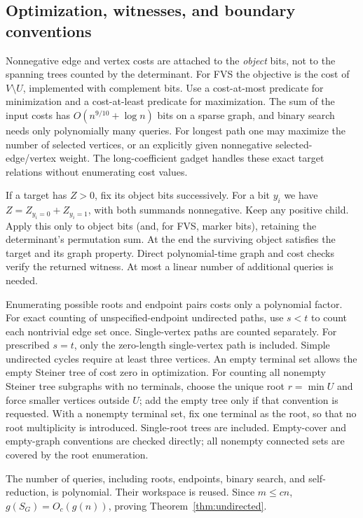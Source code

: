 \subsection{Optimization, witnesses, and boundary conventions}

Nonnegative edge and vertex costs are attached to the \emph{object}
bits, not to the spanning trees counted by the determinant. For FVS
the objective is the cost of $V\setminus U$, implemented with
complement bits. Use a cost-at-most predicate for minimization and
a cost-at-least predicate for maximization. The sum of the input
costs has $O(n^{9/10}+\log n)$ bits on a sparse graph, and binary
search needs only polynomially many queries. For longest path one
may maximize the number of selected vertices, or an explicitly given
nonnegative selected-edge/vertex weight. The long-coefficient gadget
handles these exact target relations without enumerating cost values.

If a target has $Z>0$, fix its object bits successively. For a bit $y_i$
we have $Z=Z_{y_i=0}+Z_{y_i=1}$, with both summands nonnegative.
Keep any positive child. Apply this only to object bits (and, for
FVS, marker bits), retaining the determinant's permutation sum.
At the end the surviving object satisfies the target and its graph
property. Direct polynomial-time graph and cost checks verify the
returned witness. At most a linear number of additional queries is
needed.

Enumerating possible roots and endpoint pairs costs only a polynomial
factor. For exact counting of unspecified-endpoint undirected paths,
use $s<t$ to count each nontrivial edge set once. Single-vertex paths
are counted separately. For prescribed $s=t$, only the zero-length
single-vertex path is included. Simple undirected cycles require at
least three vertices. An empty terminal set allows the empty Steiner
tree of cost zero in optimization. For counting all nonempty Steiner
tree subgraphs with no terminals, choose the unique root $r=\min U$
and force smaller vertices outside $U$; add the empty tree only if
that convention is requested. With a nonempty terminal set, fix one
terminal as the root, so that no root multiplicity is introduced.
Single-root trees are included. Empty-cover and empty-graph conventions
are checked directly; all nonempty connected sets are covered by the
root enumeration.

The number of queries, including roots, endpoints, binary search, and
self-reduction, is polynomial. Their workspace is reused. Since
$m\le cn$, $g(S_G)=O_c(g(n))$, proving
Theorem~\ref{thm:undirected}.
